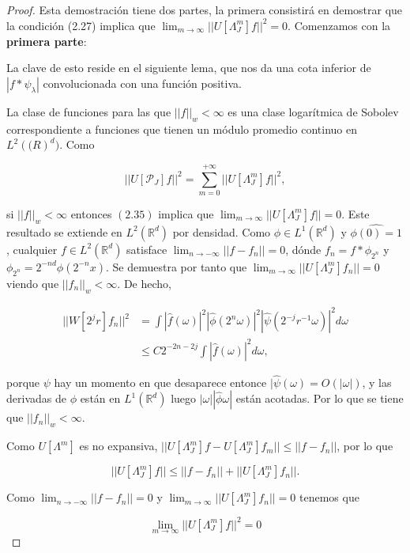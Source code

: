 \begin{proof}
  Esta demostración tiene dos partes, la primera consistirá en demostrar que la condición (2.27) implica que $\lim_{m\rightarrow \infty} ||U[\Lambda_J^m]f||^2=0$. Comenzamos con la \textbf{primera parte}:

  \noindent La clave de esto reside en el siguiente lema, que nos da una cota inferior de $|f\ast\psi_\lambda|$ convolucionada con una función positiva. 
  
  \noindent La clase de funciones para las que $||f||_w < \infty$ es una clase logarítmica de Sobolev correspondiente a funciones que tienen un módulo promedio continuo en $L^2(\mathbb(R)^d)$. Como 

  $$ || U[\mathcal{P}_J]f ||^2= \sum_{m=0}^{+\infty} ||U[\Lambda_J^m]f||^2,$$

  \noindent si $||f||_w < \infty$ entonces $(2.35)$ implica que $\lim_{m\rightarrow\infty}||U[\Lambda_J^m]f||= 0$. Este resultado se extiende en $L^2(\mathbb{R}^d)$ por densidad. Como $\phi \in L^1(\mathbb{R}^d)$ y $\widehat{\phi(0)=1}$, cualquier $f\in L^2(\mathbb{R}^d)$ satisface $\lim_{n\rightarrow - \infty} ||f-f_n||=0$, dónde $f_n=f \ast \phi_{2^n}$ y $\phi_{2^n}=2^{-nd} \phi(2^{-n}x)$. Se demuestra por tanto que $\lim_{m\rightarrow \infty} ||U[\Lambda_J^m]f_n||=0$ viendo que $||f_n||_w < \infty$. De hecho, 


  \begin{align*}
      ||W[2^jr]f_n||^2 &= \int |\widehat{f}(\omega)|^2 |\widehat{\phi}(2^n \omega)|^2 |\widehat{\psi}(2^{-j}r^{-1}\omega)|^2 d\omega \\
      &\leq C 2^{-2n-2j} \int |\widehat{f}(\omega)|^2 d\omega,
  \end{align*}

  \noindent porque $\psi$ hay un momento en que desaparece entonce $|\widehat{\psi}(\omega)=O(|\omega|)$, y las derivadas de $\phi$ están en $L^1(\mathbb{R}^d)$ luego $|\omega||\widehat{\phi}\omega|$ están acotadas. Por lo que se tiene que $||f_n||_w < \infty$.

  \medskip

  \noindent Como $U[\Lambda^m]$ es no expansiva, $||U[\Lambda_J^m]f-U[\Lambda_J^m]f_m|| \leq ||f - f_n||$, por lo que 

  $$||U[\Lambda_J^m]f|| \leq || f-f_n|| + ||U[\Lambda_J^m]f_n||.$$

  \noindent Como $\lim_{n\rightarrow -\infty}||f-f_n||=0$ y $\lim_{m\rightarrow\infty}||U[\Lambda_J^m]f_n||=0$ tenemos que 

  $$\lim_{m\rightarrow\infty} ||U[\Lambda_J^m]f||^2=0$$


\end{proof}
